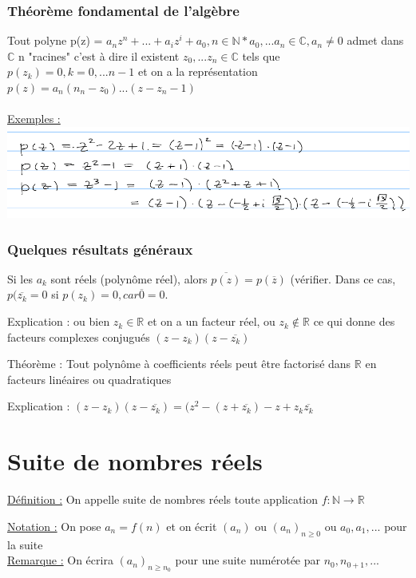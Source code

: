 \documentclass[12pt,a4paper]{article}
\newcommand{\R}{\ensuremath{\mathbb{R}} }
\newcommand{\N}{\ensuremath{\mathbb{N}} }
\begin{document}
{\subsubsection{Théorème fondamental de l'algèbre}
Tout polyne p(z) = $a_nz^n+...+a_iz^i + a_0, n\in \mathbb{N*} a_0,...a_n \in \mathbb{C}, a_n \neq 0$ admet dans $\mathbb{C}$ n "racines" c'est à dire il existent $z_0,...z_n \in \mathbb{C}$ tels que $p(z_k) = 0, k = 0,...n-1$ et on a la représentation 
$p(z) = a_n (n_n-z_0)...(z-z_n-1)$\\
\\
\underline{Exemples :}
\\
\includegraphics[scale=0.5]{illustrations_Analyse/exemples_z}

\subsubsection{Quelques résultats généraux}
Si les $a_k$ sont réels (polynôme réel), alors $\overline{p(z)} = p(\overline{z})$ (vérifier. Dans ce cas, $p(\overline{z_k} = 0$  si $p(z_k) = 0, car \overline{0} = 0$.

Explication : ou bien $z_k \in \R$ et on a un facteur réel, ou $z_k \not \in \R$ ce qui donne des facteurs complexes conjugués $(z-z_k)(z-\overline{z_k})$

Théorème : Tout polynôme à coefficients réels peut être factorisé dans $\R$ en facteurs linéaires ou quadratiques

Explication : $(z-z_k)(z-\overline{z_k}) = (z^2 - (z + \overline{z_k})-z + z_k \overline{z_k}$

\section{Suite de nombres réels}
\setcounter{equation}{0}
\begin{boite}
\underline{Définition :} On appelle suite de nombres réels toute application $f:\N \to \R$
\end{boite}
\underline{Notation :} On pose $a_n = f(n)$ et on écrit $(a_n)$ ou $(a_n)_{n \geq 0}$ ou $a_0, a_1,...$ pour la suite \\
\underline{Remarque :} On écrira $(a_n)_{n \geq n_0}$ pour une suite numérotée par $n_0,n_{0+1},...$\\

}
\end{document}
